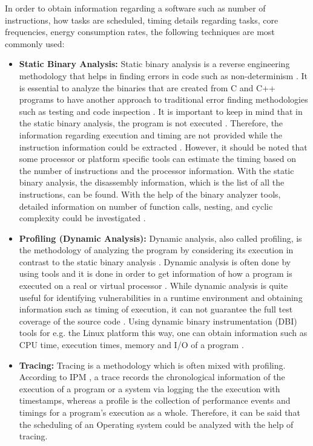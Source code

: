 In order to obtain information regarding a software such as number of instructions, how tasks are scheduled, timing details regarding tasks, core frequencies, energy consumption rates, the following techniques are most commonly used:
\begin{itemize}
	\item \textbf{Static Binary Analysis:} Static binary analysis is a reverse engineering methodology that helps in finding errors in code such as non-determinism \cite{staticanalysisPRE}. It is essential to analyze the binaries that are created from C and C++ programs to have another approach to traditional error finding methodologies such as testing and code inspection \cite{staticanalysisPRE}. It is important to keep in mind that in the static binary analysis, the program is not executed \cite{dynamicanalysisphd}. Therefore, the information regarding execution and timing are not provided while the instruction information could be extracted \cite{dynamicanalysisphd}. However, it should be noted that some processor or platform specific tools can estimate the timing based on the number of instructions and the processor information. With the static binary analysis, the disassembly information, which is the list of all the instructions, can be found. With the help of the binary analyzer tools, detailed information on number of function calls, nesting, and cyclic complexity could be investigated \cite{staticvsdynamicanalysis}. %
	\item \textbf{Profiling (Dynamic Analysis):}
	Dynamic analysis, also called profiling, is the methodology of analyzing the program by considering its execution in contrast to the static binary analysis \cite{dynamicanalysisphd}. Dynamic analysis is often done by using tools and it is done in order to get information of how a program is executed on a real or virtual processor \cite{staticvsdynamicanalysis}. While dynamic analysis is quite useful for identifying vulnerabilities in a runtime environment and obtaining information such as timing of execution, it can not guarantee the full test coverage of the source code \cite{staticvsdynamicanalysis}. Using dynamic binary instrumentation (DBI) tools for e.g. the Linux platform this way, one can obtain information such as CPU time, execution times, memory and I/O of a program \cite{dynamicanalysisphd}. 
	\item \textbf{Tracing:} Tracing is a methodology which is often mixed with profiling. According to IPM \cite{IPM}, a trace records the chronological information of the execution of a program or a system via logging the the execution with timestamps, whereas a profile is the collection of performance events and timings for a program's execution as a whole. Therefore, it can be said that the scheduling of an Operating system could be analyzed with the help of tracing. 
	

\end{itemize}
